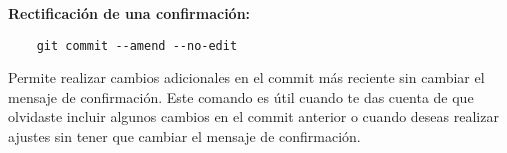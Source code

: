 
\textbf{Rectificación de una confirmación:}

\begin{verbatim}
    git commit --amend --no-edit
\end{verbatim}

Permite realizar cambios adicionales en el commit más reciente sin cambiar el mensaje de confirmación. Este comando es útil cuando te das cuenta de que olvidaste incluir algunos cambios en el commit anterior o cuando deseas realizar ajustes sin tener que cambiar el mensaje de confirmación. \\

